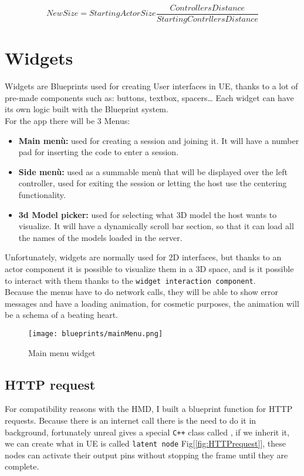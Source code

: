 \begin{equation}
    \label{math:ratio}
    New Size=Starting Actor Size \frac{Controllers Distance}{Starting Contrllers Distance}
\end{equation}
    

\section{Widgets}
\label{sec:widgets}
\noindent
Widgets are Blueprints used for creating User interfaces in \ac{UE}, thanks to a lot of pre-made components such as: buttons, textbox, spacers… Each widget can have its own logic built with the Blueprint system.\\
For the app there will be 3 Menus:
\begin{itemize}
    \item \textbf{Main menù:} used for creating a session and joining it. It will have a number pad for inserting the code to enter a session.
    \item \textbf{Side menù:} used as a summable menù that will be displayed over the left controller, used for exiting the session or letting the host use the centering functionality.
    \item \textbf{3d Model picker:} used for selecting what 3D model the host wants to visualize. It will have a dynamically scroll bar section, so that it can load all the names of the models loaded in the server. 
\end{itemize}
\noindent
Unfortunately, widgets are normally used for 2D interfaces, but thanks to an actor component it is possible to visualize them in a 3D space, and is it possible to interact with them thanks to the \texttt{widget interaction component}.\\
Because the menus have to do network calls, they will be able to show error messages and have a loading animation, for cosmetic purposes, the animation will be a schema of a beating heart.


\begin{figure}[h]
    \centering
    \texttt{[image: blueprints/mainMenu.png]}
    \caption{Main menu widget}
    \label{fig:mainMenu}
\end{figure}

\subsection{HTTP request}
\noindent
For compatibility reasons with the \ac{HMD}, I built a blueprint function for \ac{HTTP} requests.
Because there is an internet call there is the need to do it in background, fortunately unreal gives a special \texttt{C++} class called ,
if we inherit it, we can create what in \ac{UE} is called \texttt{latent node} Fig[\ref{fig:HTTPrequest}], these nodes can activate their output pins without stopping the frame until they are complete. 

